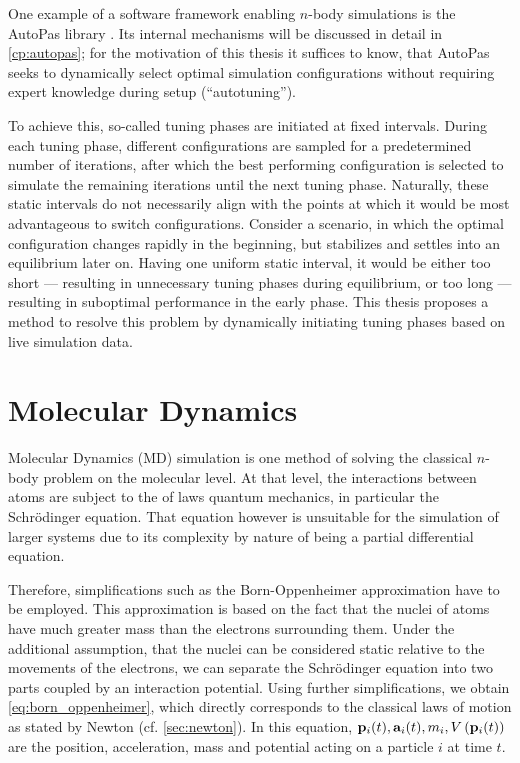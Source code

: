 One example of a software framework enabling $n$-body simulations is the AutoPas library \cite{Gratl2019}. Its internal mechanisms will be discussed in detail in \autoref{cp:autopas}; for the motivation of this thesis it suffices to know, that AutoPas seeks to dynamically select optimal simulation configurations without requiring expert knowledge during setup (\enquote{autotuning}).

To achieve this, so-called tuning phases are initiated at fixed intervals. During each tuning phase, different configurations are sampled for a predetermined number of iterations, after which the best performing configuration is selected to simulate the remaining iterations until the next tuning phase. Naturally, these static intervals do not necessarily align with the points at which it would be most advantageous to switch configurations. Consider a scenario, in which the optimal configuration changes rapidly in the beginning, but stabilizes and settles into an equilibrium later on. Having one uniform static interval, it would be either too short --- resulting in unnecessary tuning phases during equilibrium, or too long --- resulting in suboptimal performance in the early phase.
This thesis proposes a method to resolve this problem by dynamically initiating tuning phases based on live simulation data.


\section{Molecular Dynamics}
\label{sec:md}
Molecular Dynamics (MD) simulation is one method of solving the classical $n$-body problem on the molecular level. At that level, the interactions between atoms are subject to the of laws quantum mechanics, in particular the Schrödinger equation. That equation however is unsuitable for the simulation of larger systems due to its complexity by nature of being a partial differential equation.

Therefore, simplifications such as the Born-Oppenheimer approximation have to be employed. This approximation is based on the fact that the nuclei of atoms have much greater mass than the electrons surrounding them. Under the additional assumption, that the nuclei can be considered static relative to the movements of the electrons, we can separate the Schrödinger equation into two parts coupled by an interaction potential. Using further simplifications, we obtain \eqref{eq:born_oppenheimer}, which directly corresponds to the classical laws of motion as stated by Newton (cf. \autoref{sec:newton}). In this equation, $\mathbf{p}_i(t), \mathbf{a}_i(t), m_i, V\left(\mathbf{p}_i(t)\right)$ are the position, acceleration, mass and potential acting on a particle $i$ at time $t$. \cite{Born1927, Voorhis2005, Griebel2007} 

